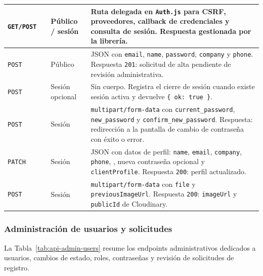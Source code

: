 {\apiTableSetup
{}
\tablefirsthead{\apiHeader}
\tablehead{\apiHeader}
\begin{supertabular}{|A{0.10\textwidth}|A{0.27\textwidth}|A{0.15\textwidth}|A{0.38\textwidth}|}
\texttt{GET/POST} &  & Público / sesión & Ruta delegada en \texttt{Auth.js} para CSRF, proveedores, callback de credenciales y consulta de sesión. Respuesta gestionada por la librería.\\
\hline
\texttt{POST} &  & Público & JSON con \texttt{email}, \texttt{name}, \texttt{password}, \texttt{company} y \texttt{phone}. Respuesta \texttt{201}: solicitud de alta pendiente de revisión administrativa.\\
\hline
\texttt{POST} &  & Sesión opcional & Sin cuerpo. Registra el cierre de sesión cuando existe sesión activa y devuelve \texttt{\{ ok: true \}}.\\
\hline
\texttt{POST} &  & Sesión & \texttt{multipart/form-data} con \texttt{current\_password}, \texttt{new\_password} y \texttt{confirm\_new\_password}. Respuesta: redirección a la pantalla de cambio de contraseña con éxito o error.\\
\hline
\texttt{PATCH} &  & Sesión & JSON con datos de perfil: \texttt{name}, \texttt{email}, \texttt{company}, \texttt{phone}, , nueva contraseña opcional y \texttt{clientProfile}. Respuesta \texttt{200}: perfil actualizado.\\
\hline
\texttt{POST} &  & Sesión & \texttt{multipart/form-data} con \texttt{file} y \texttt{previousImageUrl}. Respuesta \texttt{200}: \texttt{imageUrl} y \texttt{publicId} de Cloudinary.\\
\hline
\end{supertabular}
}

\subsubsection{Administración de usuarios y solicitudes}

La Tabla~\ref{tab:api-admin-users} resume los endpoints administrativos dedicados a usuarios, cambios de estado, roles, contraseñas y revisión de solicitudes de registro.

